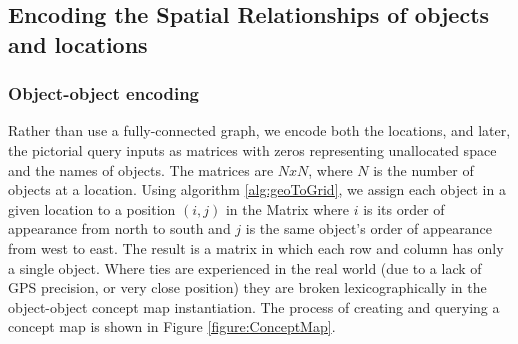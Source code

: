 \subsection{Encoding the Spatial Relationships of objects and locations}

\subsubsection{Object-object encoding}
Rather than use a fully-connected graph, we encode both the locations, and later, the pictorial query inputs as matrices with zeros representing unallocated space and the names of objects. 
The matrices are $NxN$, where $N$ is the number of objects at a location. 
Using algorithm \ref{alg:geoToGrid}, we assign each object in a given location to a position $(i,j)$ in the Matrix where $i$ is its order of appearance from north to south and $j$ is the same object's order of appearance from west to east. 
The result is a matrix in which each row and column has only a single object. 
Where ties are experienced in the real world (due to a lack of GPS precision, or very close position) they are broken lexicographically in the object-object concept map instantiation.
The process of creating and querying a concept map is shown in Figure \ref{figure:ConceptMap}.







